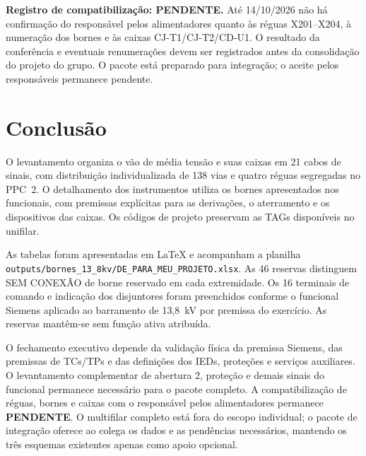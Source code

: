 \documentclass[11pt,a4paper]{article}
\begin{document}
\textbf{Registro de compatibilização: PENDENTE.} Até 14/10/2026 não há confirmação
do responsável pelos alimentadores quanto às réguas X201--X204, à numeração
dos bornes e às caixas CJ-T1/CJ-T2/CD-U1. O resultado da conferência e eventuais
renumerações devem ser registrados antes da consolidação do projeto do grupo.
O pacote está preparado para integração; o aceite pelos responsáveis permanece
pendente.

\clearpage
\section{Conclusão}
O levantamento organiza o vão de média tensão e suas caixas em 21 cabos de sinais,
com distribuição individualizada de 138 vias e quatro réguas segregadas no PPC~2.
O detalhamento dos instrumentos utiliza os bornes apresentados nos funcionais,
com premissas explícitas para as derivações, o aterramento e os dispositivos das
caixas. Os códigos de projeto preservam as TAGs disponíveis no unifilar.

As tabelas foram apresentadas em \LaTeX{} e acompanham a planilha
\nolinkurl{outputs/bornes_13_8kv/DE_PARA_MEU_PROJETO.xlsx}.
As 46 reservas distinguem SEM CONEXÃO de borne reservado em cada extremidade.
Os 16 terminais de comando e indicação dos disjuntores foram preenchidos
conforme o funcional Siemens aplicado ao barramento de 13,8~kV por premissa
do exercício. As reservas mantêm-se sem função ativa atribuída.

O fechamento executivo depende da validação física da premissa Siemens,
das premissas de TCs/TPs e das definições dos IEDs, proteções e serviços auxiliares.
O levantamento complementar de abertura 2, proteção e demais sinais do
funcional permanece necessário para o pacote completo.
A compatibilização de réguas, bornes e caixas com o responsável pelos
alimentadores permanece \textbf{PENDENTE}. O multifilar completo está fora do
escopo individual; o pacote de integração oferece ao colega os dados e as
pendências necessários, mantendo os três esquemas existentes apenas como apoio
opcional.
\end{document}
